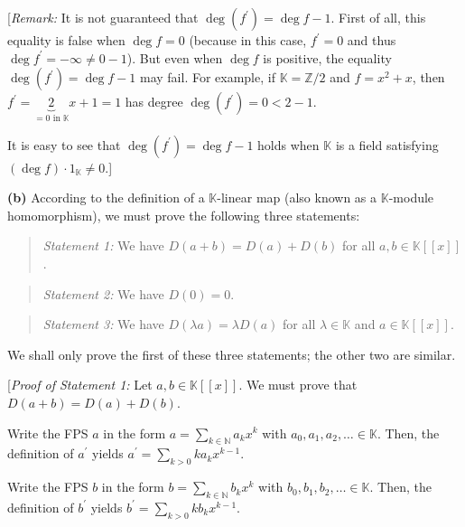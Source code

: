 \documentclass[paper=a4, fontsize=12pt]{scrartcl}%
\let\sumnonlimits\sum
\renewcommand{\sum}{\sumnonlimits\limits}
\theoremstyle{plainsl}
\theoremstyle{definition}
\theoremstyle{remark}
\newenvironment{statement}{\begin{quote}}{\end{quote}}
\begin{document}
[\textit{Remark:} It is not guaranteed that $\deg\left(  f^{\prime}\right)
=\deg f-1$. First of all, this equality is false when $\deg f=0$ (because in
this case, $f^{\prime}=0$ and thus $\deg f^{\prime}=-\infty\neq0-1$). But even
when $\deg f$ is positive, the equality $\deg\left(  f^{\prime}\right)  =\deg
f-1$ may fail. For example, if $\mathbb{K}=\mathbb{Z}/2$ and $f=x^{2}+x$, then
$f^{\prime}=\underbrace{2}_{=0\text{ in }\mathbb{K}}x+1=1$ has degree
$\deg\left(  f^{\prime}\right)  =0<2-1$.

It is easy to see that $\deg\left(  f^{\prime}\right)  =\deg f-1$ holds when
$\mathbb{K}$ is a field satisfying $\left(  \deg f\right)  \cdot1_{\mathbb{K}%
}\neq0$.]

\bigskip

\textbf{(b)} According to the definition of a $\mathbb{K}$-linear map (also
known as a $\mathbb{K}$-module homomorphism), we must prove the following
three statements:

\begin{statement}
\textit{Statement 1:} We have $D\left(  a+b\right)  =D\left(  a\right)
+D\left(  b\right)  $ for all $a,b\in\mathbb{K}\left[  \left[  x\right]
\right]  $.
\end{statement}

\begin{statement}
\textit{Statement 2:} We have $D\left(  0\right)  =0$.
\end{statement}

\begin{statement}
\textit{Statement 3:} We have $D\left(  \lambda a\right)  =\lambda D\left(
a\right)  $ for all $\lambda\in\mathbb{K}$ and $a\in\mathbb{K}\left[  \left[
x\right]  \right]  $.
\end{statement}

We shall only prove the first of these three statements; the other two are similar.

[\textit{Proof of Statement 1:} Let $a,b\in\mathbb{K}\left[  \left[  x\right]
\right]  $. We must prove that $D\left(  a+b\right)  =D\left(  a\right)
+D\left(  b\right)  $.

Write the FPS $a$ in the form $a=\sum_{k\in\mathbb{N}}a_{k}x^{k}$ with
$a_{0},a_{1},a_{2},\ldots\in\mathbb{K}$. Then, the definition of $a^{\prime}$
yields $a^{\prime}=\sum_{k>0}ka_{k}x^{k-1}$.

Write the FPS $b$ in the form $b=\sum_{k\in\mathbb{N}}b_{k}x^{k}$ with
$b_{0},b_{1},b_{2},\ldots\in\mathbb{K}$. Then, the definition of $b^{\prime}$
yields $b^{\prime}=\sum_{k>0}kb_{k}x^{k-1}$.
\end{document}
